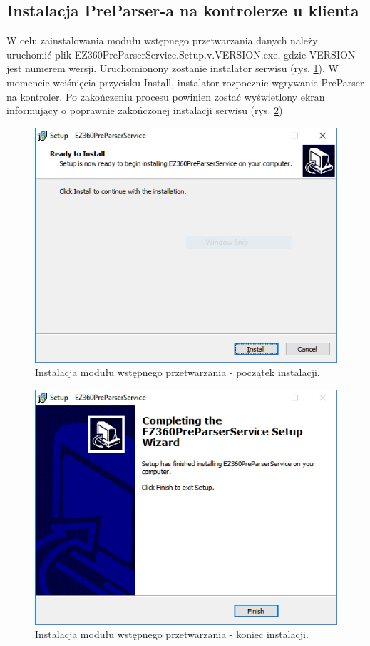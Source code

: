 \documentclass[a4paper]{book}
\begin{document}
\subsection{Instalacja PreParser-a na kontrolerze u klienta}
W celu zainstalowania  modułu wstępnego przetwarzania danych należy uruchomić plik EZ360PreParserService.Setup.v.VERSION.exe, gdzie VERSION jest numerem wersji.
Uruchomionony zostanie instalator serwisu (rys. \ref{fig:preparser_installation_part1}). W momencie wciśnięcia przycisku Install, instalator rozpocznie wgrywanie PreParser na kontroler. Po zakończeniu procesu powinien zostać wyświetlony ekran informujący o poprawnie zakończonej instalacji serwisu (rys. \ref{fig:preparser_installation_part2})
\begin{figure}[t]
	\centering
	\includegraphics[width=\textwidth]{./img/preparser_installation_part1.png}
	\caption{Instalacja modułu wstępnego przetwarzania - początek instalacji.}
	\label{fig:preparser_installation_part1}
\end{figure}
\begin{figure}[t]
	\centering
	\includegraphics[width=\textwidth]{./img/preparser_installation_part2.png}
	\caption{Instalacja modułu wstępnego przetwarzania - koniec instalacji.}
	\label{fig:preparser_installation_part2}
\end{figure}
\end{document}
